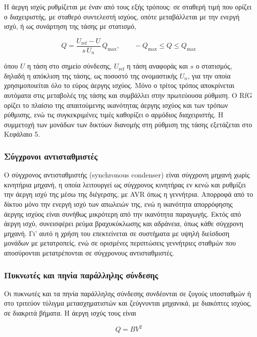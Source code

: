 Η άεργη ισχύς ρυθμίζεται με έναν από τους εξής τρόπους: σε σταθερή τιμή που ορίζει ο
διαχειριστής, με σταθερό συντελεστή ισχύος, οπότε μεταβάλλεται με την ενεργή ισχύ, ή ως
συνάρτηση της τάσης με στατισμό,

\begin{equation}
Q = \frac{U_{\mathrm{ref}} - U}{s\,U_n}\,Q_{\max}, \qquad -Q_{\max} \le Q \le Q_{\max}
\label{eq:qu}
\end{equation}

όπου $U$ η τάση στο σημείο σύνδεσης, $U_{\mathrm{ref}}$ η τάση αναφοράς και $s$ ο στατισμός,
δηλαδή η απόκλιση της τάσης, ως ποσοστό της ονομαστικής $U_n$, για την οποία
χρησιμοποιείται όλο το εύρος άεργης ισχύος. Μόνο ο τρίτος τρόπος αποκρίνεται αυτόματα στις
μεταβολές της τάσης και συμβάλλει στην πρωτεύουσα ρύθμιση. Ο RfG ορίζει το πλαίσιο της
απαιτούμενης ικανότητας άεργης ισχύος και των τρόπων ρύθμισης, ενώ τις συγκεκριμένες τιμές
καθορίζει ο αρμόδιος διαχειριστής. Η συμμετοχή των μονάδων των δικτύων διανομής στη ρύθμιση
της τάσης εξετάζεται στο Κεφάλαιο 5.

\subsubsection{Σύγχρονοι αντισταθμιστές}

Ο σύγχρονος αντισταθμιστής (synchronous condenser) είναι σύγχρονη μηχανή χωρίς κινητήρια
μηχανή, η οποία λειτουργεί ως σύγχρονος κινητήρας εν κενώ και ρυθμίζει την άεργη ισχύ της
μέσω της διέγερσης, με AVR όπως η γεννήτρια. Απορροφά από το δίκτυο μόνο την ενεργή ισχύ των
απωλειών της, ενώ η ικανότητα απορρόφησης άεργης ισχύος είναι συνήθως μικρότερη από την
ικανότητα παραγωγής. Εκτός από άεργη ισχύ, συνεισφέρει ρεύμα βραχυκύκλωσης και αδράνεια,
όπως κάθε σύγχρονη μηχανή. Γι' αυτό η χρήση του επεκτείνεται σε συστήματα με υψηλή διείσδυση
μονάδων με μετατροπείς, ενώ σε ορισμένες περιπτώσεις γεννήτριες σταθμών που αποσύρονται
μετατρέπονται σε σύγχρονους αντισταθμιστές.

\subsubsection{Πυκνωτές και πηνία παράλληλης σύνδεσης}

Οι πυκνωτές και τα πηνία παράλληλης σύνδεσης συνδέονται σε ζυγούς υποσταθμών ή στο τριτεύον
τύλιγμα μετασχηματιστών και ζεύγνυνται μηχανικά, με διακόπτες ισχύος, σε διακριτά βήματα. Η
άεργη ισχύς τους είναι

\begin{equation}
Q = B V^2
\label{eq:shunt}
\end{equation}

